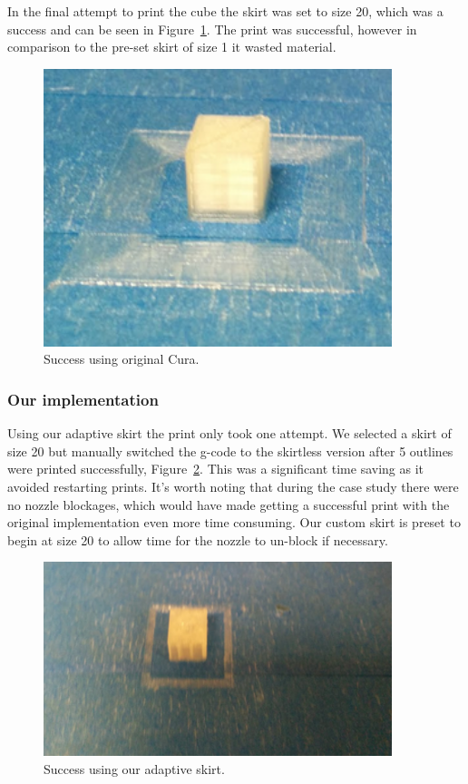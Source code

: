 \documentclass[11pt]{report} %
\begin{document}
In the final attempt to print the cube the skirt was set to size 20, which was a success and can be seen in Figure~\ref{figure:SkirtOld2}. The print was successful, however in comparison to the pre-set skirt of size 1 it wasted material. 

\begin{figure}[H]
  \centering
  \includegraphics[width=4in]{SkirtOld2.png}
  \caption{Success using original Cura.}
  \label{figure:SkirtOld2}
\end{figure}

\subsubsection{Our implementation}
Using our adaptive skirt the print only took one attempt. We selected a skirt of size 20 but manually switched the g-code to the skirtless version after 5 outlines were printed successfully, Figure~\ref{figure:SkirtNew1}. This was a significant time saving as it avoided restarting prints. It's worth noting that during the case study there were no nozzle blockages, which would have made getting a successful print with the original implementation even more time consuming. Our custom skirt is preset to begin at size 20 to allow time for the nozzle to un-block if necessary.


\begin{figure}[H]
  \centering
  \includegraphics[width=4in]{SkirtNew1.png}
  \caption{Success using our adaptive skirt.}
  \label{figure:SkirtNew1}
\end{figure}
\end{document}
